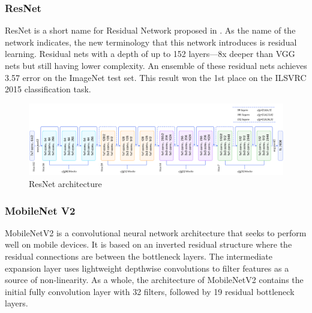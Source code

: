 \subsubsection{ResNet}
ResNet is a short name for Residual Network proposed in \cite{art32}. As the name of the
network indicates, the new terminology that this network introduces is residual learning.
Residual nets with a depth of up to 152 layers—8x deeper than VGG nets but still having
lower complexity. An ensemble of these residual nets achieves 3.57 error on the ImageNet
test set. This result won the 1st place on the ILSVRC 2015 classification task.
\begin{figure}[!h]
    \centering
    \includegraphics[width=1\textwidth]{chapters/chapter02/fig02/resnet50.png}
    \caption{ ResNet architecture}
    \label{fig:my_label}
\end{figure}

\subsubsection{MobileNet V2}
MobileNetV2 is a convolutional neural network architecture that seeks to perform well on mobile devices. It is based on an inverted residual structure where the residual connections are between the bottleneck layers. The intermediate expansion layer uses lightweight depthwise convolutions to filter features as a source of non-linearity. As a whole, the architecture of MobileNetV2 contains the initial fully convolution layer with 32 filters, followed by 19 residual bottleneck layers. \cite{art40}

